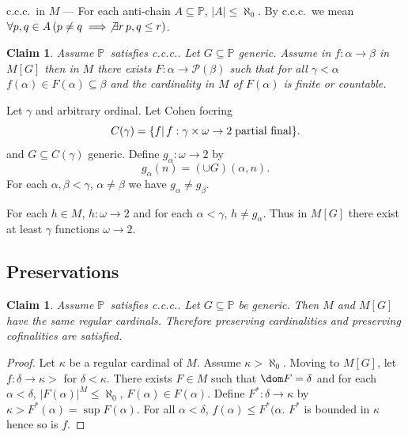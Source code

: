 \documentclass[11pt,pdftex,twoside,a4paper]{article}
\newcommand{\ccc}{c.c.c.}
\newcommand{\dsP}{\ensuremath{\mathds{P}}}
\newcommand{\Power}{\ensuremath{\mathcal{P}}}
\newtheorem{claim}[thm]{Claim}
\theoremstyle{definition}
\begin{document}
\ccc\ in $M$ --- For each anti-chain \(A\subseteq\dsP\), \(|A|\leq\aleph_0\).
By \ccc\ we mean
 \(\forall p,q\in A\, (p\neq q \implies \not\exists r\, p,q\leq r)\).

\begin{claim}
Assume \dsP\ satisfies \ccc. Let \(G\subseteq\dsP\) generic.
Assume in \(f:\alpha\to\beta\) in \(M[G]\) then in $M$ there exists
\(F:\alpha\to\Power(\beta)\) such that for all \(\gamma<\alpha\)
\(f(\alpha)\in F(\alpha)\subseteq\beta\)
and the cardinality in $M$ of \(F(\alpha)\) is finite or countable.
\end{claim}

Let \(\gamma\) and arbitrary ordinal. Let Cohen focring
\begin{equation*}
C(\gamma) = \{f|\, f:\gamma\times\omega\to 2\; \textnormal{partial final}\}.
\end{equation*}
and \(G\subseteq C(\gamma)\) generic.
Define \(g_\alpha:\omega\to2\) by
\begin{equation*}
g_\alpha(n) = \left(\cup G\right)(\alpha,n).
\end{equation*}
For each \(\alpha,\beta<\gamma\), \(\alpha\neq\beta\)
we have \(g_\alpha\neq g_\beta\).

For each \(h\in M\), \(h:\omega\to2\) and for each \(\alpha<\gamma\),
\(h\neq g_\alpha\).
Thus in \(M[G]\) there exist at least \(\gamma\) functions \(\omega\to 2\).

\subsection{Preservations}

\begin{claim}
Assume \dsP\ satisfies \ccc. Let \(G\subseteq\dsP\) be generic.
Then $M$ and \(M[G]\) have the same regular cardinals.
Therefore preserving cardinalities and preserving cofinalities are satisfied.
\end{claim}
\begin{proof}
Let \(\kappa\) be a regular cardinal of $M$. Assume \(\kappa>\aleph_0\).
Moving to \(M[G]\), let \(f:\delta\to\kappa>\) for \(\delta<\kappa\).
There exists \(F\in M\) such that \(\dom F=\delta\)
and for each \(\alpha<\delta\), \(|F(\alpha)|^M\leq\aleph_0\),
\(F(\alpha)\in F(\alpha)\). Define \(F^*:\delta\to\kappa\)
by \(\kappa > F^*(\alpha)=\sup F(\alpha)\).
For all \(\alpha<\delta\), \(f(\alpha)\leq F^*(\alpha\).
\(F^*\) is bounded in \(\kappa\) hence so is $f$.
\end{proof}
\end{document}
